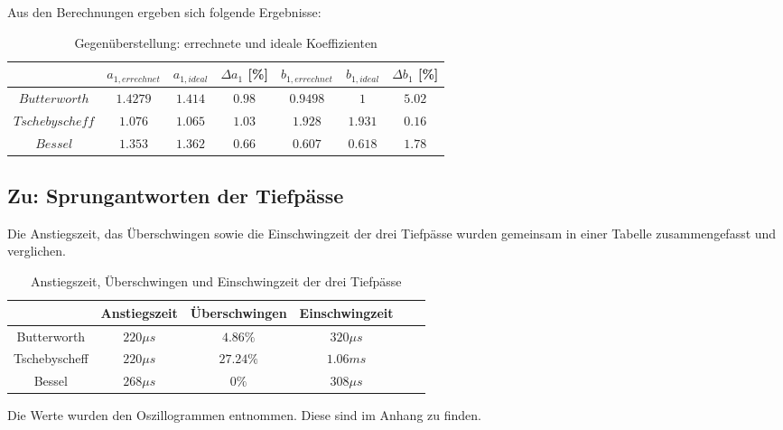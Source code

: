 \noindent Aus den Berechnungen ergeben sich folgende Ergebnisse: \\

	\begin{table}[h]
		\centering
		\begin{tabular}{c|c|c|c||c|c|c}
			$ $             & $ a_{1, errechnet} $ & $ a_{1, ideal} $ & $\Delta a_1$ [\%] 
							& $b_{1, errechnet} $ & $ b_{1, ideal} $ & $\Delta b_1$ [\%] \\
			\hline	
			$Butterworth$   & $1.4279$             & $1.414$          & $0.98$            
			                & $0.9498$             & $1$              & $5.02$  \\ 	  	
			\hline
			$Tschebyscheff$ & $1.076$              & $1.065$          & $1.03$ 
			                & $1.928$              & $1.931$          & $0.16$  \\  
			\hline
			$ Bessel$ 		& $1.353$	           & $1.362$          & $0.66$  
			                & $0.607$              & $0.618$		  & $1.78$
		\end{tabular}
		\caption{Gegenüberstellung: errechnete und ideale Koeffizienten }
		\label{tab:koeffizienten}
	\end{table}
	
\newpage

\subsection{Zu: Sprungantworten der Tiefpässe}
\noindent Die Anstiegszeit, das Überschwingen sowie die Einschwingzeit der drei Tiefpässe wurden gemeinsam in einer Tabelle zusammengefasst und verglichen.

\begin{table}[h]
	\centering
	\begin{tabular}{c|c|c|c|c|c}
						& Anstiegszeit 	& Überschwingen	& Einschwingzeit  \\
		\hline
		Butterworth		& $220\mu s$	& $4.86\%$		& $320\mu s$ \\
		\hline
		Tschebyscheff	& $220\mu s$	& $27.24\%$		& $1.06ms$   \\
		\hline
		Bessel			& $268\mu s$	& $0\%$			& $308\mu s$ \\
	\end{tabular}
	\caption{Anstiegszeit, Überschwingen und Einschwingzeit der drei Tiefpässe}
	\label{tab:sprungantworten_tp}
\end{table}

\noindent Die Werte wurden den Oszillogrammen entnommen. Diese sind im Anhang zu finden.

